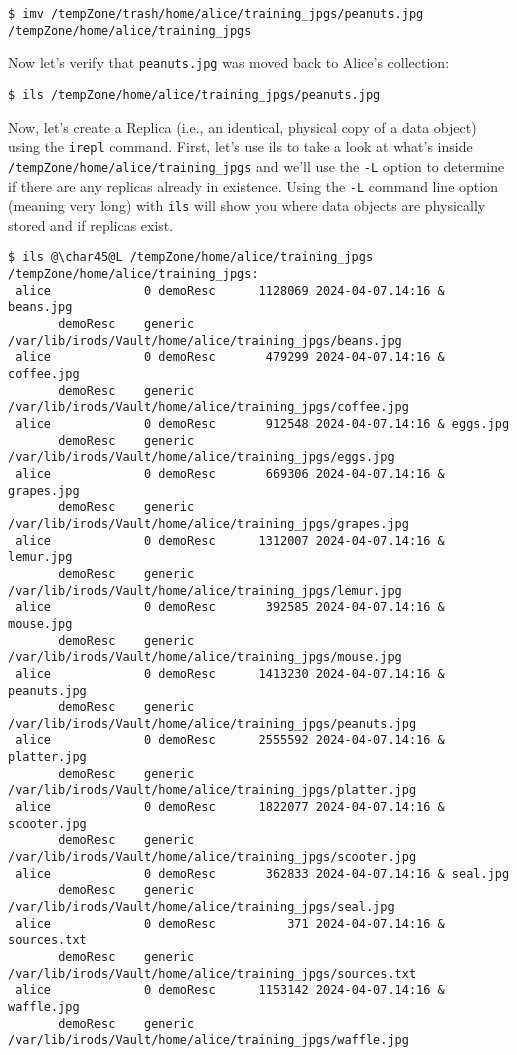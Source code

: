 \documentclass[10pt,oneside]{memoir}
\begin{document}
\begin{lstlisting}[basicstyle=\tiny\ttfamily]
$ imv /tempZone/trash/home/alice/training_jpgs/peanuts.jpg /tempZone/home/alice/training_jpgs
\end{lstlisting}

Now let's verify that \texttt{peanuts.jpg} was moved back to Alice's collection:

\begin{lstlisting}
$ ils /tempZone/home/alice/training_jpgs/peanuts.jpg
\end{lstlisting}

\newpage

Now, let's create a Replica (i.e., an identical, physical copy of a data object) using the \texttt{irepl} command. First, let's use ils to take a look at what's inside \texttt{/tempZone/home/alice/training\_jpgs} and we'll use the \texttt{-L} option to determine if there are any replicas already in existence. Using the \texttt{-L} command line option (meaning very long) with \texttt{ils} will show you where data objects are physically stored and if replicas exist.

\begin{lstlisting}[basicstyle=\tiny\ttfamily]
$ ils @\char45@L /tempZone/home/alice/training_jpgs
/tempZone/home/alice/training_jpgs:
 alice             0 demoResc      1128069 2024-04-07.14:16 & beans.jpg
       demoResc    generic    /var/lib/irods/Vault/home/alice/training_jpgs/beans.jpg
 alice             0 demoResc       479299 2024-04-07.14:16 & coffee.jpg
       demoResc    generic    /var/lib/irods/Vault/home/alice/training_jpgs/coffee.jpg
 alice             0 demoResc       912548 2024-04-07.14:16 & eggs.jpg
       demoResc    generic    /var/lib/irods/Vault/home/alice/training_jpgs/eggs.jpg
 alice             0 demoResc       669306 2024-04-07.14:16 & grapes.jpg
       demoResc    generic    /var/lib/irods/Vault/home/alice/training_jpgs/grapes.jpg
 alice             0 demoResc      1312007 2024-04-07.14:16 & lemur.jpg
       demoResc    generic    /var/lib/irods/Vault/home/alice/training_jpgs/lemur.jpg
 alice             0 demoResc       392585 2024-04-07.14:16 & mouse.jpg
       demoResc    generic    /var/lib/irods/Vault/home/alice/training_jpgs/mouse.jpg
 alice             0 demoResc      1413230 2024-04-07.14:16 & peanuts.jpg
       demoResc    generic    /var/lib/irods/Vault/home/alice/training_jpgs/peanuts.jpg
 alice             0 demoResc      2555592 2024-04-07.14:16 & platter.jpg
       demoResc    generic    /var/lib/irods/Vault/home/alice/training_jpgs/platter.jpg
 alice             0 demoResc      1822077 2024-04-07.14:16 & scooter.jpg
       demoResc    generic    /var/lib/irods/Vault/home/alice/training_jpgs/scooter.jpg
 alice             0 demoResc       362833 2024-04-07.14:16 & seal.jpg
       demoResc    generic    /var/lib/irods/Vault/home/alice/training_jpgs/seal.jpg
 alice             0 demoResc          371 2024-04-07.14:16 & sources.txt
       demoResc    generic    /var/lib/irods/Vault/home/alice/training_jpgs/sources.txt
 alice             0 demoResc      1153142 2024-04-07.14:16 & waffle.jpg
       demoResc    generic    /var/lib/irods/Vault/home/alice/training_jpgs/waffle.jpg
\end{lstlisting}
\end{document}
